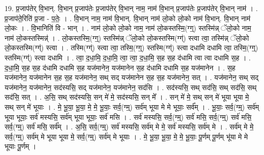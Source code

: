 \documentclass[17pt]{extarticle}
\begin{document}
19. प्र॒जाप॑तेर् वि॒भान्. वि॒भान् प्र॒जाप॑तेः प्र॒जाप॑तेर् वि॒भान् नाम॒ नाम॑ वि॒भान् प्र॒जाप॑तेः प्र॒जाप॑तेर् वि॒भान् नाम॑ । . प्र॒जाप॑ते॒रिति॑ प्र॒जा - प॒तेः॒ । . वि॒भान् नाम॒ नाम॑ वि॒भान्. वि॒भान् नाम॑ लो॒को लो॒को नाम॑ वि॒भान्. वि॒भान् नाम॑ लो॒कः । . वि॒भानिति॑ वि - भान् । . नाम॑ लो॒को लो॒को नाम॒ नाम॑ लो॒कस्तस्मि॒(ग्ग्॒) स्तस्मि॑न्न् ॅलो॒को नाम॒ नाम॑ लो॒कस्तस्मिन्न्॑ । . लो॒कस्तस्मि॒(ग्ग्॒) स्तस्मि॑न्न् ॅलो॒को लो॒कस्तस्मि(ग्ग्॑) स्त्वा त्वा॒ तस्मि॑न्न् ॅलो॒को लो॒कस्तस्मि(ग्ग्॑) स्त्वा । . तस्मि(ग्ग्॑) स्त्वा त्वा॒ तस्मि॒(ग्ग्॒) स्तस्मि(ग्ग्॑) स्त्वा दधामि दधामि त्वा॒ तस्मि॒(ग्ग्॒) स्तस्मि(ग्ग्॑) स्त्वा दधामि । . त्वा॒ द॒धा॒मि॒ द॒धा॒मि॒ त्वा॒ त्वा॒ द॒धा॒मि॒ स॒ह स॒ह द॑धामि त्वा त्वा दधामि स॒ह । . द॒धा॒मि॒ स॒ह स॒ह द॑धामि दधामि स॒ह यज॑मानेन॒ यज॑मानेन स॒ह द॑धामि दधामि स॒ह यज॑मानेन । . स॒ह यज॑मानेन॒ यज॑मानेन स॒ह स॒ह यज॑मानेन॒ सथ् सद् यज॑मानेन स॒ह स॒ह यज॑मानेन॒ सत् । . यज॑मानेन॒ सथ् सद् यज॑मानेन॒ यज॑मानेन॒ सद॑स्यसि॒ सद् यज॑मानेन॒ यज॑मानेन॒ सद॑सि । . सद॑स्यसि॒ सथ् सद॑सि॒ सथ् सद॑सि॒ सथ् सद॑सि॒ सत् । . अ॒सि॒ सथ् सद॑स्यसि॒ सन् मे॑ मे॒ सद॑स्यसि॒ सन् मे᳚ । . सन् मे॑ मे॒ सथ् सन् मे॑ भूया भूया मे॒ सथ् सन् मे॑ भूयाः । . मे॒ भू॒या॒ भू॒या॒ मे॒ मे॒ भू॒याः॒ सर्व॒(ग्म्॒) सर्व॑म् भूया मे मे भूयाः॒ सर्व᳚म् । . भू॒याः॒ सर्व॒(ग्म्॒) सर्व॑म् भूया भूयाः॒ सर्व॑ मस्यसि॒ सर्व॑म् भूया भूयाः॒ सर्व॑ मसि । . सर्व॑ मस्यसि॒ सर्व॒(ग्म्॒) सर्व॑ मसि॒ सर्व॒(ग्म्॒) सर्व॑ मसि॒ सर्व॒(ग्म्॒) सर्व॑ मसि॒ सर्व᳚म् । . अ॒सि॒ सर्व॒(ग्म्॒) सर्व॑ मस्यसि॒ सर्व॑म् मे मे॒ सर्व॑ मस्यसि॒ सर्व॑म् मे । . सर्व॑म् मे मे॒ सर्व॒(ग्म्॒) सर्व॑म् मे भूया भूया मे॒ सर्व॒(ग्म्॒) सर्व॑म् मे भूयाः । . मे॒ भू॒या॒ भू॒या॒ मे॒ मे॒ भू॒याः॒ पू॒र्णम् पू॒र्णम् भू॑या मे मे भूयाः पू॒र्णम् । \newline
\end{document}
